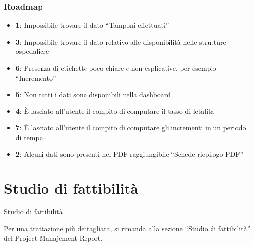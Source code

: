 \documentclass[handout]{beamer}
\begin{document}
			\begin{frame}
				\frametitle{Roadmap}
				\begin{itemize}[<+->]
					\item<1-> \textbf{1}: Impossibile trovare il dato ``Tamponi effettuati''\\
					\item<2-> \textbf{3}: Impossibile trovare il dato relativo alle disponibilità nelle strutture ospedaliere\\
					\item<3-> \textbf{6}: Presenza di etichette poco chiare e non esplicative, per esempio ``Incremento''\\
					\item<4-> \textbf{5}: Non tutti i dati sono disponibili nella dashboard
					\item<5-> \textbf{4}: \`E lasciato all'utente il compito di computare il tasso di letalità\\
					\item<6-> \textbf{7}: \`E lasciato all'utente il compito di computare gli incrementi in un periodo di tempo\\
					\item<7-> \textbf{2}: Alcuni dati sono presenti nel PDF raggiungibile ``Schede riepilogo PDF''\\
				\end{itemize}
			\end{frame}

	\section{Studio di fattibilità}
		\begin{frame}
			\centering
			\begin{Huge}
				Studio di fattibilità
			\end{Huge}
			\mbox{}
			\vfill
			\vspace*{100px}
			\begin{tiny}
				Per una trattazione più dettagliata, si rimanda alla sezione ``Studio di fattibilità'' del Project Manajement Report.
			\end{tiny}
		\end{frame}
\end{document}
